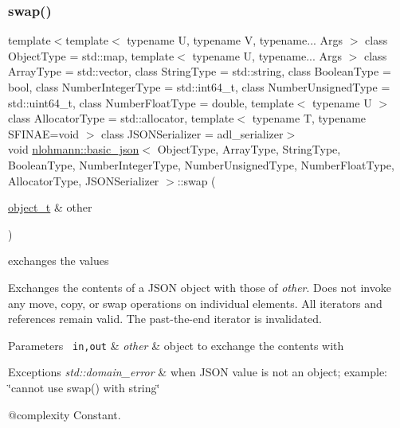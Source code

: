 \subsubsection{\texorpdfstring{swap()}{swap()}\hspace{0.1cm}{\footnotesize\ttfamily [3/4]}}
{\footnotesize\ttfamily template$<$template$<$ typename U, typename V, typename... Args $>$ class Object\+Type = std\+::map, template$<$ typename U, typename... Args $>$ class Array\+Type = std\+::vector, class String\+Type  = std\+::string, class Boolean\+Type  = bool, class Number\+Integer\+Type  = std\+::int64\+\_\+t, class Number\+Unsigned\+Type  = std\+::uint64\+\_\+t, class Number\+Float\+Type  = double, template$<$ typename U $>$ class Allocator\+Type = std\+::allocator, template$<$ typename T, typename S\+F\+I\+N\+A\+E=void $>$ class J\+S\+O\+N\+Serializer = adl\+\_\+serializer$>$ \\
void \mbox{\hyperlink{classnlohmann_1_1basic__json}{nlohmann\+::basic\+\_\+json}}$<$ Object\+Type, Array\+Type, String\+Type, Boolean\+Type, Number\+Integer\+Type, Number\+Unsigned\+Type, Number\+Float\+Type, Allocator\+Type, J\+S\+O\+N\+Serializer $>$\+::swap (\begin{DoxyParamCaption}\item[{\mbox{\hyperlink{classnlohmann_1_1basic__json_aa1eb13d5aa86f80cbee6c58e90fbaf49}{object\+\_\+t}} \&}]{other }\end{DoxyParamCaption})\hspace{0.3cm}{\ttfamily [inline]}}



exchanges the values 

Exchanges the contents of a J\+S\+ON object with those of {\itshape other}. Does not invoke any move, copy, or swap operations on individual elements. All iterators and references remain valid. The past-\/the-\/end iterator is invalidated.


\begin{DoxyParams}[1]{Parameters}
\mbox{\texttt{ in,out}}  & {\em other} & object to exchange the contents with\\
\hline
\end{DoxyParams}

\begin{DoxyExceptions}{Exceptions}
{\em std\+::domain\+\_\+error} & when J\+S\+ON value is not an object; example\+: {\ttfamily \char`\"{}cannot use swap() with string\char`\"{}}\\
\hline
\end{DoxyExceptions}
@complexity Constant.

